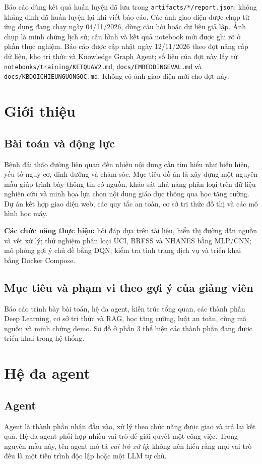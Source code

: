 \documentclass[12pt,a4paper]{article}
\renewcommand{\_}{\textunderscore\allowbreak}\setlength{\emergencystretch}{3em}
\begin{document}
Báo cáo dùng kết quả huấn luyện đã lưu trong \texttt{artifacts/*/report.json}; không khẳng định đã huấn luyện lại khi viết báo cáo. Các ảnh giao diện được chụp từ ứng dụng đang chạy ngày 04/11/2026, dùng câu hỏi hoặc dữ liệu giả lập. Ảnh chụp là minh chứng lịch sử; cấu hình và kết quả notebook mới được ghi rõ ở phần thực nghiệm. Báo cáo được cập nhật ngày 12/11/2026 theo đợt nâng cấp dữ liệu, kho tri thức và Knowledge Graph Agent; số liệu của đợt này lấy từ \texttt{notebooks/training/KET\_QUA\_V2.md}, \texttt{docs/EMBEDDING\_EVAL.md} và \texttt{docs/KB\_DOI\_CHIEU\_NGUON\_GOC.md}. Không có ảnh giao diện mới cho đợt này.
\newpage{}
\section{Giới thiệu}
\subsection{Bài toán và động lực}
Bệnh đái tháo đường liên quan đến nhiều nội dung cần tìm hiểu như biểu hiện, yếu tố nguy cơ, dinh dưỡng và chăm sóc. Mục tiêu đồ án là xây dựng một nguyên mẫu giúp trình bày thông tin có nguồn, khảo sát khả năng phân loại trên dữ liệu nghiên cứu và minh họa lựa chọn nội dung giáo dục thông qua học tăng cường. Dự án kết hợp giao diện web, các quy tắc an toàn, cơ sở tri thức đồ thị và các mô hình học máy.

\textbf{Các chức năng thực hiện:} hỏi đáp dựa trên tài liệu, hiển thị đường dẫn nguồn và vết xử lý; thử nghiệm phân loại UCI, BRFSS và NHANES bằng MLP/CNN; mô phỏng gợi ý chủ đề bằng DQN; kiểm tra tình trạng dịch vụ và triển khai bằng Docker Compose.
\subsection{Mục tiêu và phạm vi theo gợi ý của giảng viên}
Báo cáo trình bày bài toán, hệ đa agent, kiến trúc tổng quan, các thành phần Deep Learning, cơ sở tri thức và RAG, học tăng cường, luật an toàn, cùng mã nguồn và minh chứng demo. Sơ đồ ở phần 3 thể hiện các thành phần đang được triển khai trong hệ thống.

\section{Hệ đa agent}
\subsection{Agent}
Agent là thành phần nhận đầu vào, xử lý theo chức năng được giao và trả lại kết quả. Hệ đa agent phối hợp nhiều vai trò để giải quyết một công việc. Trong nguyên mẫu này, tên agent mô tả \emph{vai trò xử lý}; không nên hiểu rằng mọi vai trò đều là một tiến trình độc lập hoặc một LLM tự chủ.
\end{document}

